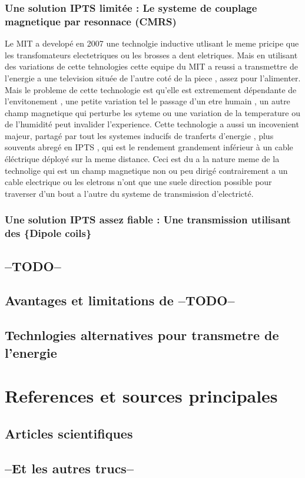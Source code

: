 \documentclass[11pt]{report}
\begin{document}
\subsection{Une solution IPTS limitée : Le systeme de couplage magnetique par resonnace (CMRS)}
	Le MIT a developé en 2007 une technolgie inductive utlisant le meme pricipe que les transfomateurs electetriques ou les brosses a dent eletriques. Mais en utilisant des variations de cette tehnologies cette equipe du MIT a reussi a transmettre de l'energie a une television située de l'autre coté de la piece , assez pour l'alimenter. Mais le probleme de cette technologie est qu'elle est extremement dépendante de l'envitonement , une petite variation tel le passage d'un etre humain , un autre champ magnetique qui perturbe les syteme ou une variation de la temperature ou de l'humidité peut invalider l'experience. Cette technologie a aussi un incovenient majeur, partagé par tout les systemes inducifs de tranferts d'energie , plus souvents abregé en IPTS , qui est le rendement grandement inférieur à un cable éléctrique déployé sur la meme distance. Ceci est du a la nature meme de la technolige qui est un champ magnetique non ou peu dirigé contrairement a un cable electrique ou les eletrons n'ont que une suele direction possible pour traverser d'un bout a l'autre du systeme de transmission d'electricté.
\subsection{Une solution IPTS assez fiable : Une transmission utilisant des \{Dipole coils\}}
\section{--TODO--} %
\section{Avantages et limitations de --TODO--}
\section{Technlogies alternatives pour transmetre de l'energie}

\chapter{References et sources principales}
\section{Articles scientifiques}
\section{--Et les autres trucs--}
\end{document}
